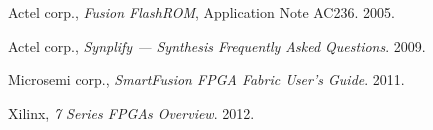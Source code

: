 \documentclass[12pt,a4paper]{article} %
\begin{document}
{\begin{thebibliography}{9}
			Actel corp.,
			\textit{Fusion FlashROM}, Application Note AC236. %
			2005.
		
			Actel corp.,
			\textit{Synplify — Synthesis Frequently Asked Questions}. %
			2009.
		
			Microsemi corp.,
			\textit{SmartFusion FPGA Fabric User's Guide}.
			2011.
		
			Xilinx,
			\textit{7 Series FPGAs Overview}.
			2012.
	\end{thebibliography}
	} %
	
	\clearpage
	
	
	\clearpage
	\begin{appendices} %
	
	\end{appendices}
	
	
	
\end{document}
